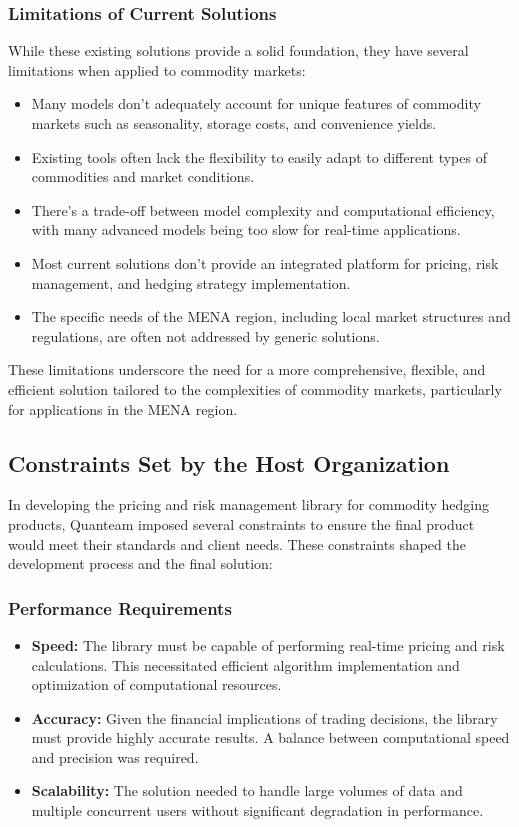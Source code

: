 \documentclass[12pt]{article}
\begin{document}
\subsubsection{Limitations of Current Solutions}
While these existing solutions provide a solid foundation, they have several limitations when applied to commodity markets:
\begin{itemize}
\item Many models don't adequately account for unique features of commodity markets such as seasonality, storage costs, and convenience yields.
\item Existing tools often lack the flexibility to easily adapt to different types of commodities and market conditions.
\item There's a trade-off between model complexity and computational efficiency, with many advanced models being too slow for real-time applications.
\item Most current solutions don't provide an integrated platform for pricing, risk management, and hedging strategy implementation.
\item The specific needs of the MENA region, including local market structures and regulations, are often not addressed by generic solutions.
\end{itemize}
These limitations underscore the need for a more comprehensive, flexible, and efficient solution tailored to the complexities of commodity markets, particularly for applications in the MENA region.

\subsection{Constraints Set by the Host Organization}
In developing the pricing and risk management library for commodity hedging products, Quanteam imposed several constraints to ensure the final product would meet their standards and client needs. These constraints shaped the development process and the final solution:
\subsubsection{Performance Requirements}
\begin{itemize}
\item \textbf{Speed:} The library must be capable of performing real-time pricing and risk calculations. This necessitated efficient algorithm implementation and optimization of computational resources.
\item \textbf{Accuracy:} Given the financial implications of trading decisions, the library must provide highly accurate results. A balance between computational speed and precision was required.

\item \textbf{Scalability:} The solution needed to handle large volumes of data and multiple concurrent users without significant degradation in performance.
\end{itemize}
\end{document}

